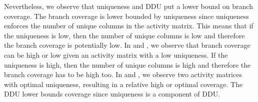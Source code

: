 \documentclass[twoside,a4paper,11pt]{memoir}
\begin{document}
Nevertheless, we observe that uniqueness and DDU put a lower bound on branch coverage.
The branch coverage is lower bounded by uniqueness since uniqueness enforces the number of unique columns in the activity matrix.
This means that if the uniqueness is low, then the number of unique columns is low and therefore the branch coverage is potentially low.
In  and , we observe that branch coverage can be high or low given an activity matrix with a low uniqueness.
If the uniqueness is high, then the number of unique columns is high and therefore the branch coverage has to be high too.
In  and , we observe two activity matrices with optimal uniqueness, resulting in a relative high or optimal coverage.
The DDU lower bounds coverage since uniqueness is a component of DDU\@.
\end{document}
